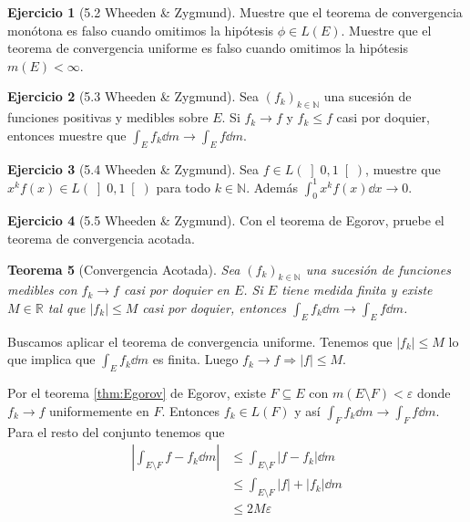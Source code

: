 \documentclass[12pt]{article}
\theoremstyle{plain}
\newtheorem{Th}{Teorema}[subsection]   %
\theoremstyle{definition}
\newtheorem{Ej}[Th]{Ejercicio}
\theoremstyle{remark}
\numberwithin{equation}{section}
\newcommand{\bN}{\mathbb{N}}        %
\newcommand{\bR}{\mathbb{R}}        %
\renewcommand{\leq}{\leqslant}      %
\renewcommand{\:}{\colon}           %
\newcommand{\obonj}[1]{\left\rbrack#1\right\lbrack}
\begin{document}
\begin{multicols}{2}
\begin{Ej}[5.2  Wheeden \& Zygmund]
Muestre que el teorema de convergencia monótona es falso cuando omitimos la hipótesis $\phi\in L(E)$. Muestre que el teorema de convergencia uniforme es falso cuando omitimos la hipótesis $m(E)<\infty$.
\end{Ej}


\begin{Ej}[5.3  Wheeden \& Zygmund]
Sea $(f_k)_{k\in\bN}$ una sucesión de funciones positivas y medibles sobre $E$. Si $f_k\to f$ y $f_k\leq f$ casi por doquier, entonces muestre que $\int_Ef_k\dd m\to\int_Ef\dd m$.
\end{Ej}

\begin{Ej}[5.4  Wheeden \& Zygmund]
Sea $f\in L(\obonj{0,1})$, muestre que $x^kf(x)\in L(\obonj{0,1})$ para todo $k\in\bN$. Además $\int_{0}^{1}x^kf(x)\dd x\to 0$.
\end{Ej}

\begin{Ej}[5.5  Wheeden \& Zygmund]
Con el teorema de Egorov, pruebe el teorema de convergencia acotada.
\end{Ej}

\begin{Th}[Convergencia Acotada]\label{thm:BoundedCvg}
    Sea $(f_k)_{k\in\bN}$ una sucesión de funciones medibles con $f_k\to f$ casi por doquier en $E$. Si $E$ tiene medida finita y existe $M\in\bR$ tal que $|f_k|\leq M$ casi por doquier, entonces $\int_Ef_k\dd m\to \int_Ef\dd m$.
\end{Th}
\begin{ptcbp}
Buscamos aplicar el teorema de convergencia uniforme. Tenemos que $|f_k|\leq M$ lo que implica que $\int_Ef_k\dd m$ es finita. Luego $f_k\to f\Rightarrow |f|\leq M$.\par
Por el teorema \ref{thm:Egorov} de Egorov, existe $F\subseteq E$ con $m(E\setminus F)<\varepsilon$ donde $f_k\to f$ uniformemente en $F$. Entonces $f_k\in L(F)$ y así $\int_Ff_k\dd m\to\int_Ff\dd m$. Para el resto del conjunto tenemos que
\begin{align*}
  \left|\int_{E\setminus F}f-f_k\dd m\right| &\leq \int_{E\setminus F}|f-f_k|\dd m\\
  &\leq \int_{E\setminus F}|f|+|f_k|\dd m\\
  &\leq 2M\varepsilon
\end{align*}
\end{ptcbp}


\end{multicols}
\end{document}
